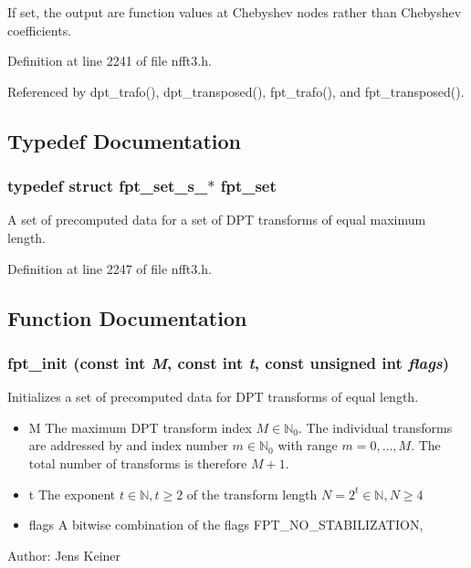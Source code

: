 If set, the output are function values at Chebyshev nodes rather than Chebyshev coefficients. 



Definition at line 2241 of file nfft3.h.

Referenced by dpt\_\-trafo(), dpt\_\-transposed(), fpt\_\-trafo(), and fpt\_\-transposed().

\subsection{Typedef Documentation}
\hypertarget{group__fpt_g73d630ac21d6474ba0693f124d465e15}{
\subsubsection{\setlength{\rightskip}{0pt plus 5cm}typedef struct fpt\_\-set\_\-s\_\-$\ast$ {\bf fpt\_\-set}}}
\label{group__fpt_g73d630ac21d6474ba0693f124d465e15}


A set of precomputed data for a set of DPT transforms of equal maximum length. 



Definition at line 2247 of file nfft3.h.

\subsection{Function Documentation}
\hypertarget{group__fpt_gd103ad18c75ee5dd048392dfd1ca7305}{
\subsubsection{ fpt\_\-init (const int {\em M}, const int {\em t}, const unsigned int {\em flags})}}
\label{group__fpt_gd103ad18c75ee5dd048392dfd1ca7305}


Initializes a set of precomputed data for DPT transforms of equal length. 

\begin{itemize}
\item M The maximum DPT transform index $M \in \mathbb{N}_0$. The individual transforms are addressed by and index number $m \in \mathbb{N}_0$ with range $m = 0,\ldots,M$. The total number of transforms is therefore $M+1$. \item t The exponent $t \in \mathbb{N}, t \ge 2$ of the transform length $N = 2^t \in \mathbb{N}, N \ge 4$ \item flags A bitwise combination of the flags FPT\_\-NO\_\-STABILIZATION,\end{itemize}
\begin{Desc}
\item[Author:]Jens Keiner \end{Desc}


